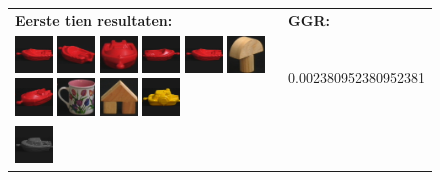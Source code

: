 \begin{figure}[tbp]
\begin{center}
\begin{tabular}{m{11cm} | m{3cm} |}
\textbf{Eerste tien resultaten:} & \textbf{GGR:} \\
\vspace{4pt}
\includegraphics[width=1cm]{coil/beeld-18.eps}
\includegraphics[width=1cm]{coil/beeld-22.eps}
\includegraphics[width=1cm]{coil/beeld-20.eps}
\includegraphics[width=1cm]{coil/beeld-19.eps}
\includegraphics[width=1cm]{coil/beeld-18.eps}
\includegraphics[width=1cm]{coil/beeld-3.eps}
\includegraphics[width=1cm]{coil/beeld-21.eps}
\includegraphics[width=1cm]{coil/beeld-7.eps}
\includegraphics[width=1cm]{coil/beeld-43.eps}
\includegraphics[width=1cm]{coil/beeld-12.eps}
& {\scriptsize 0.002380952380952381}
\\
\includegraphics[width=1cm]{coil/beeld-24.eps}

\end{tabular}
\end{center}
\end{figure}
